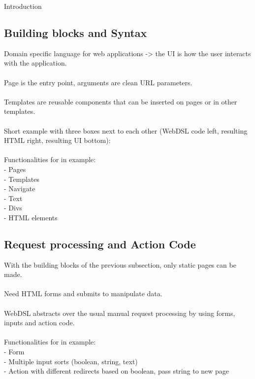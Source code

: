     Introduction

    \subsection{\label{subsec:building-blocks}Building blocks and Syntax}

      Domain specific language for web applications -> the UI is how the user interacts with the application.
      \\\\Page is the entry point, arguments are clean URL parameters. \\\\Templates are reusable components that can be inserted on pages or in other templates.
      \\\\Short example with three boxes next to each other (WebDSL code left, resulting HTML right, resulting UI bottom):
      \\\\Functionalities for in example:
      \\- Pages
      \\- Templates
      \\- Navigate
      \\- Text
      \\- Divs
      \\- HTML elements

    \subsection{\label{subsec:request-processing}Request processing and Action Code}

      With the building blocks of the previous subsection, only static pages can be made.
      \\\\Need HTML forms and submits to manipulate data.
      \\\\WebDSL abstracts over the usual manual request processing by using forms, inputs and action code.
      \\\\Functionalities for in example:
      \\- Form
      \\- Multiple input sorts (boolean, string, text)
      \\- Action with different redirects based on boolean, pass string to new page

